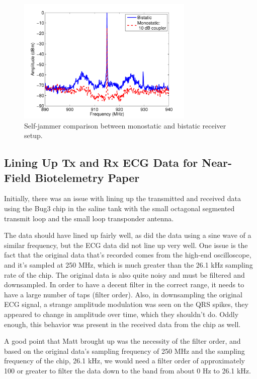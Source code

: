 \documentclass[12pt,onecolumn,titlepage]{article}
\begin{document}
\begin{figure}[htbp]
	\centering
	\includegraphics[width=0.75\textwidth]{Pictures/13Mar2013/ECG_OTA_self_jammer_comparison}
	\caption{Self-jammer comparison between monostatic and bistatic receiver setup.}
	\label{fig:ECG_OTA_self_jammer_comparison}
\end{figure}



\subsection{Lining Up Tx and Rx ECG Data for Near-Field Biotelemetry Paper}
\indent \indent Initially, there was an issue with lining up the transmitted and received data using the Bug3 chip in the saline tank with the small octagonal segmented transmit loop and the small loop transponder antenna. 

The data should have lined up fairly well, as did the data using a sine wave of a similar frequency, but the ECG data did not line up very well. One issue is the fact that the original data that's recorded comes from the high-end oscilloscope, and it's sampled at 250 MHz, which is much greater than the 26.1 kHz sampling rate of the chip. The original data is also quite noisy and must be filtered and downsampled. In order to have a decent filter in the correct range, it needs to have a large number of taps (filter order). Also, in downsampling the original ECG signal, a strange amplitude modulation was seen on the QRS spikes, they appeared to change in amplitude over time, which they shouldn't do. Oddly enough, this behavior was present in the received data from the chip as well.

A good point that Matt brought up was the necessity of the filter order, and based on the original data's sampling frequency of 250 MHz and the sampling frequency of the chip, 26.1 kHz, we would need a filter order of approximately 100 or greater to filter the data down to the band from about 0 Hz to 26.1 kHz.
\end{document}
